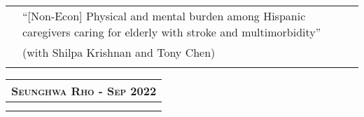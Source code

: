 \documentclass[10pt]{article}
\begin{document}
\begin{center}
\begin{tabular}{llllr}
& \multicolumn{4}{l}{\textquotedblleft [Non-Econ]\,\,Physical and mental burden among Hispanic caregivers caring for elderly with stroke and multimorbidity\textquotedblright }\\
& \multicolumn{4}{l}{(with Shilpa Krishnan and Tony Chen)} \\
\multicolumn{5}{p{500pt}}{}\\
\end{tabular}

\clearpage

\begin{tabular}{ccccc}
\multicolumn{5}{r}{\textsc{Seunghwa Rho - Sep 2022}} \vspace{0.2cm}\\ \hline
\multicolumn{5}{p{500pt}}{}\\\\
\end{tabular}


\end{center}
\end{document}
